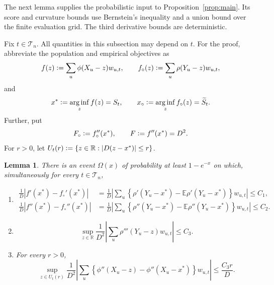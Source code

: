 \documentclass[11pt]{article}
\newcommand{\E}{\mathbb{E}}
\newcommand{\R}{\mathbb{R}}
\newcommand{\eqdef}{\mathrel{\vcentcolon=}}
\newcommand{\arginf}{\mathop{\mathrm{arg\,inf}}}
\newcommand{\rhohu}{\rho}
\newcommand{\rhohum}{\phi}
\newcommand{\Signal}{X}
\newcommand{\Data}{Y}
\newcommand{\IMFs}{S}
\newcommand{\IMFt}{\widetilde S}
\newcommand{\IF}{F}
\newcommand{\IFP}{F_{\circ}}
\newcommand{\DFN}{D}
\newcommand{\fs}{f}
\newcommand{\fp}{f_{\circ}}
\newcommand{\xs}{x^{*}}
\newcommand{\xp}{x_{\circ}}
\newcommand{\xx}{x}
\newtheorem{lemma}[proposition]{Lemma}
\begin{document}
The next lemma supplies the probabilistic input to
Proposition~\ref{prop:main}.  Its score and curvature bounds use Bernstein's
inequality and a union bound over the finite evaluation grid.  The third
derivative bounds are deterministic.

Fix \(t\in\mathcal T_n\).  All quantities in this subsection may depend on
\(t\).  For the proof, abbreviate the population and empirical objectives as
\begin{equation}
  \fs(z)\eqdef\sum_u\rhohum(\Signal_u-z)w_{u,t},
  \qquad
  \fp(z)\eqdef\sum_u\rhohu(\Data_u-z)w_{u,t},
  \label{eq:objectives}
\end{equation}
and
\begin{equation}
  \xs\eqdef\arginf_z\fs(z)=\IMFs_t,
  \qquad
  \xp\eqdef\arginf_z\fp(z)=\IMFt_t.
  \label{eq:minimizers}
\end{equation}
Further, put
\begin{equation}
  \IFP\eqdef\fp''(\xs),
  \qquad
  \IF\eqdef\fs''(\xs)=\DFN^2.
  \label{eq:F-Fcirc}
\end{equation}
For \(r>0\), let
\(U_t(r)\eqdef\{z\in\R:|\DFN(z-\xs)|\leq r\}\).

\begin{lemma}\label{lem:local}
There is an event \(\Omega(\xx)\) of probability at least \(1-e^{-\xx}\)
on which, simultaneously for every \(t\in\mathcal T_n\),
\begin{enumerate}
\renewcommand{\labelenumi}{(\roman{enumi})}
\item
\begin{align}
  \frac{1}{\DFN}
  |\fs'(\xs)-\fp'(\xs)|
  &=\frac{1}{\DFN}
    \left|\sum_u
      \left\{\rhohu'(\Data_u-\xs)
      -\E\rhohu'(\Data_u-\xs)\right\}w_{u,t}
    \right|
  \leq C_1,
  \label{eq:lemma-score}\\
  \frac{1}{\DFN}
  |\fs''(\xs)-\fp''(\xs)|
  &=\frac{1}{\DFN}
    \left|\sum_u
      \left\{\rhohu''(\Data_u-\xs)
      -\E\rhohu''(\Data_u-\xs)\right\}w_{u,t}
    \right|
  \leq C_2.
  \label{eq:lemma-hessian}
\end{align}

\item
\begin{equation}
  \sup_{z\in\R}
  \frac{1}{\DFN^2}
  \left|\sum_u\rhohu'''(\Data_u-z)w_{u,t}\right|
  \leq C_3.
  \label{eq:lemma-third}
\end{equation}

\item For every \(r>0\),
\begin{equation}
  \sup_{z\in U_t(r)}
  \frac{1}{\DFN^2}
  \left|\sum_u
    \left\{
      \rhohum''(\Signal_u-z)
      -\rhohum''(\Signal_u-\xs)
    \right\}w_{u,t}
  \right|
  \leq \frac{C_3r}{\DFN}.
  \label{eq:lemma-population-hessian}
\end{equation}
\end{enumerate}
\end{lemma}
\end{document}
